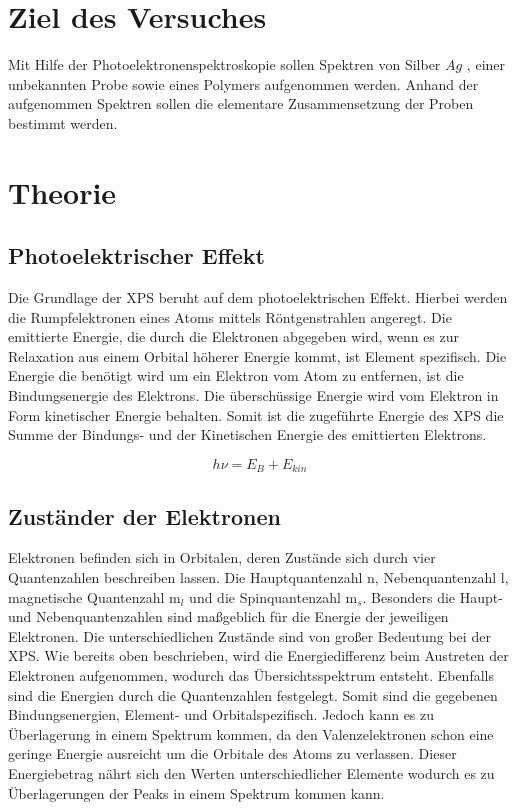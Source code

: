 \documentclass{article}
\begin{document}
\section{Ziel des Versuches}
Mit Hilfe der Photoelektronenspektroskopie sollen Spektren von Silber $Ag$ , einer unbekannten Probe sowie eines Polymers aufgenommen werden. Anhand der aufgenommen Spektren sollen die elementare Zusammensetzung der Proben bestimmt werden.

\section {Theorie~\supercite{skript} ~\supercite{harris}}

\subsection{Photoelektrischer Effekt}

Die Grundlage der XPS beruht auf dem photoelektrischen Effekt. Hierbei werden die Rumpfelektronen eines Atoms mittels Röntgenstrahlen angeregt. Die emittierte Energie, die durch die Elektronen abgegeben wird, wenn es zur Relaxation aus einem Orbital höherer Energie kommt, ist Element spezifisch. Die Energie die benötigt wird um ein Elektron vom Atom zu entfernen, ist die Bindungsenergie des Elektrons. Die überschüssige Energie wird vom Elektron in Form kinetischer Energie behalten. Somit ist die zugeführte Energie des XPS die Summe der Bindungs- und der Kinetischen Energie des emittierten Elektrons.

\begin{equation}
    h\nu = E_B + E_{kin}
\end{equation}

\subsection{Zuständer der Elektronen}



Elektronen befinden sich in Orbitalen, deren Zustände sich durch vier Quantenzahlen beschreiben lassen. Die Hauptquantenzahl n, Nebenquantenzahl l, magnetische Quantenzahl m$_l$ und die Spinquantenzahl m$_s$. Besonders die Haupt- und Nebenquantenzahlen sind maßgeblich für die Energie der jeweiligen Elektronen. Die unterschiedlichen Zustände sind von großer Bedeutung bei der XPS. Wie bereits oben beschrieben, wird die Energiedifferenz beim Austreten der Elektronen aufgenommen, wodurch das Übersichtsspektrum entsteht. Ebenfalls sind die Energien durch die Quantenzahlen festgelegt. Somit sind die gegebenen Bindungsenergien, Element- und Orbitalspezifisch. Jedoch kann es zu Überlagerung in einem Spektrum kommen, da den Valenzelektronen schon eine geringe Energie ausreicht um die Orbitale des Atoms zu verlassen. Dieser Energiebetrag nährt sich den Werten unterschiedlicher Elemente wodurch es zu Überlagerungen der Peaks in einem Spektrum kommen kann.
\end{document}

